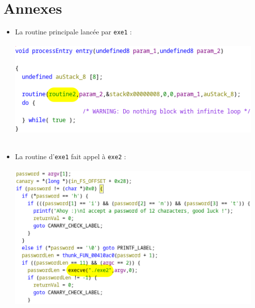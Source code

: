 \documentclass[12pt]{article}
\begin{document}
  \section{Annexes}
  \begin{itemize}
     \item La routine principale lancée par \texttt{exe1} : \\
    \\
  \includegraphics[scale=0.5]{"./0.png"}\\
  \\
  \item La routine d'\texttt{exe1} fait appel à \texttt{exe2} : \\
   \\
  \includegraphics[scale=0.5]{"./1.png"}
  
  \newpage
  

\end{itemize}
\end{document}
